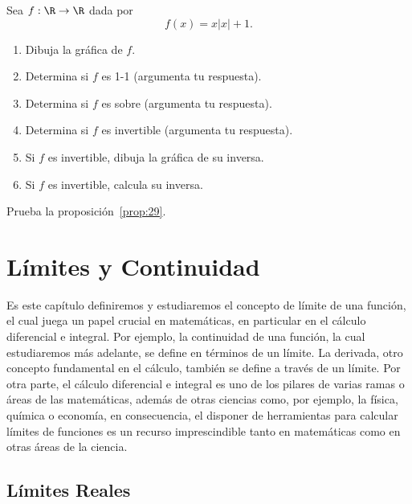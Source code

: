\documentclass[12pt,a4paper]{book}
\begin{document}
    \begin{ejercicio}\label{ej:127}
        Sea $f:\R\to\R$ dada por
        \begin{equation*}
            f(x)=x|x|+1.
        \end{equation*}
        \begin{enumerate}[nosep]
            \item Dibuja la gráfica de $f$.
            \item Determina si $f$ es 1-1 (argumenta tu respuesta).
            \item Determina si $f$ es sobre (argumenta tu respuesta).
            \item Determina si $f$ es invertible (argumenta tu respuesta).
            \item Si $f$ es invertible, dibuja la gráfica de su inversa.
            \item Si $f$ es invertible, calcula su inversa.
        \end{enumerate}
    \end{ejercicio}

    \begin{ejercicio}\label{ej:128}
        Prueba la proposición~\ref{prop:29}.
    \end{ejercicio}

    \chapter{Límites y Continuidad}\label{cap:limites}

    Es este capítulo definiremos y estudiaremos el concepto de límite de una
    función, el cual juega un papel crucial en matemáticas, en particular en el
    cálculo diferencial e integral. Por ejemplo, la continuidad de una función, la
    cual estudiaremos más adelante, se define en términos de un límite. La derivada,
    otro concepto fundamental en el cálculo, también se define a través de
    un límite. Por otra parte, el cálculo diferencial e integral es uno de los pilares
    de varias ramas o áreas de las matemáticas, además de otras ciencias como,
    por ejemplo, la física, química o economía, en consecuencia, el disponer de
    herramientas para calcular límites de funciones es un recurso imprescindible
    tanto en matemáticas como en otras áreas de la ciencia.

    \section{Límites Reales}
\end{document}
